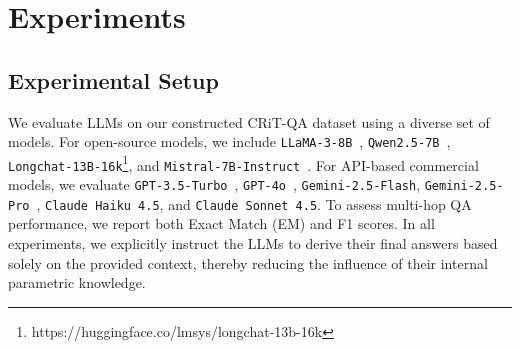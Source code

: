 \documentclass[10pt, a4paper]{article}
\begin{document}
\section{Experiments}
\subsection{Experimental Setup}
We evaluate LLMs on our constructed CRiT-QA dataset using a diverse set of models. For open-source models, we include \texttt{LLaMA-3-8B}~\cite{dubey2024llama}, \texttt{Qwen2.5-7B}~\cite{qwen2025qwen25technicalreport}, \texttt{Longchat-13B-16k}\footnote{https://huggingface.co/lmsys/longchat-13b-16k}, and \texttt{Mistral-7B-Instruct}~\cite{jiang2023mistral7b}. For API-based commercial models, we evaluate \texttt{GPT-3.5-Turbo}~\cite{brown2020languagemodelsfewshotlearners}, \texttt{GPT-4o}~\cite{hurst2024gpt}, \texttt{Gemini-2.5-Flash}, \texttt{Gemini-2.5-Pro}~\cite{comanici2025gemini}, \texttt{Claude Haiku 4.5}, and \texttt{Claude Sonnet 4.5}. To assess multi-hop QA performance, we report both Exact Match (EM) and F1 scores. In all experiments, we explicitly instruct the LLMs to derive their final answers based solely on the provided context, thereby reducing the influence of their internal parametric knowledge.
\end{document}
